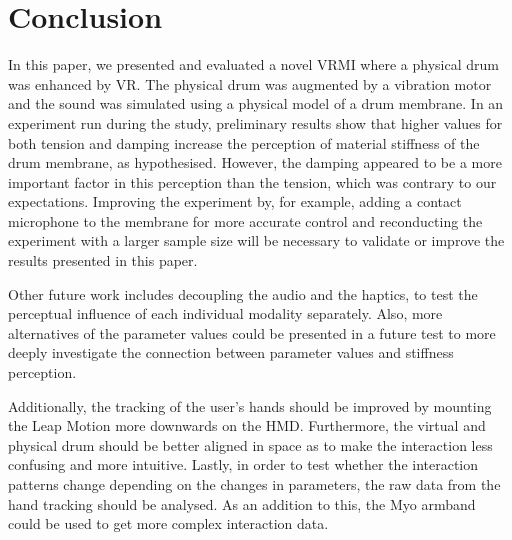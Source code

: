 \documentclass{article}
\begin{document}

\section{Conclusion}\label{sec:conc}

In this paper, we presented and evaluated a novel VRMI where a physical drum was enhanced by VR. The physical drum was augmented by a vibration motor and the sound was simulated using a physical model of a drum membrane. In an experiment run during the study, preliminary results show that higher values for both tension and damping increase the perception of material stiffness of the drum membrane, as hypothesised. However, the damping appeared to be a more important factor in this perception than the tension, which was contrary to our expectations. Improving the experiment by, for example, adding a contact microphone to the membrane for more accurate control and reconducting the experiment with a larger sample size will be necessary to validate or improve the results presented in this paper.

Other future work includes decoupling the audio and the haptics, to test the perceptual influence of each individual modality separately. Also, more alternatives of the parameter values could be presented in a future test to more deeply investigate the connection between parameter values and stiffness perception.

Additionally, the tracking of the user's hands should be improved by mounting the Leap Motion more downwards on the HMD. Furthermore, the virtual and physical drum should be better aligned in space as to make the interaction less confusing and more intuitive.
Lastly, in order to test whether the interaction patterns change depending on the changes in parameters, the raw data from the hand tracking should be analysed. As an addition to this, the Myo armband could be used to get more complex interaction data.


\end{document}
